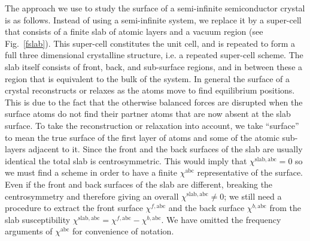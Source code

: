\documentclass[floatfix,prb,aps,superscriptaddress,showpacs,letterpaper]{revtex4}
\begin{document}

The approach we use to study the surface of a semi-infinite
semiconductor crystal is as follows. Instead of using a
semi-infinite system, we replace it by a super-cell that 
consists of a finite
slab of atomic layers and a vacuum region (see Fig.~\ref{fslab}). This
super-cell constitutes the unit cell, and
is repeated to form a full three dimensional crystalline structure,
i.e. a repeated super-cell scheme. 
The slab itself consists of front, back, and 
sub-surface regions, and in between these
a region that is equivalent to the
bulk of the system. 
In general the surface of a crystal reconstructs or relaxes as the atoms
move to find equilibrium positions. This is due to the fact that
the otherwise
balanced forces are disrupted when the surface atoms do not find their 
partner atoms that are now absent at the slab surface.
To take the reconstruction or relaxation into account, 
we take ``surface'' to mean
the true surface of the first layer of atoms and
some of the atomic sub-layers adjacent to it.
Since the front and the back
surfaces of the slab are usually identical the total slab is
centrosymmetric. This would imply that 
$\chi^{\mathrm{slab},\mathrm{a}\mathrm{b}\mathrm{c}}=0$ so we must
find a scheme 
in order to have a finite $\chi^{\mathrm{a}\mathrm{b}\mathrm{c}}$ representative of the
surface. Even if the front and back surfaces of the slab 
are different, breaking the centrosymmetry and therefore giving an
overall $\chi^{\mathrm{slab},\mathrm{a}\mathrm{b}\mathrm{c}}\ne 0$; we still
need a procedure to extract the front surface $\chi^{f,\mathrm{a}\mathrm{b}\mathrm{c}}$
and the back surface $\chi^{b,\mathrm{a}\mathrm{b}\mathrm{c}}$ from the slab
susceptibility 
$\chi^{\mathrm{slab},\mathrm{a}\mathrm{b}\mathrm{c}}=\chi^{f,\mathrm{a}\mathrm{b}\mathrm{c}}-\chi^{b,\mathrm{a}\mathrm{b}\mathrm{c}}$.
We have omitted the frequency arguments of $\chi^{\mathrm{a}\mathrm{b}\mathrm{c}}$ for 
convenience of notation.
\end{document}
